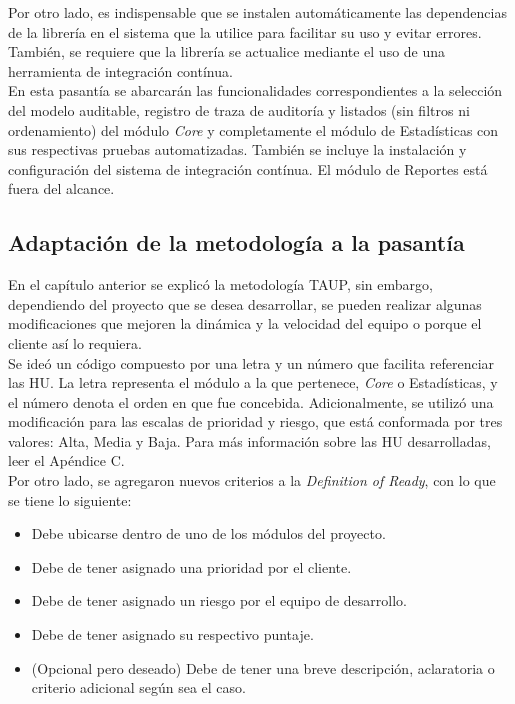 Por otro lado, es indispensable que se instalen automáticamente las dependencias de la librería en el sistema que la utilice para facilitar su uso y evitar errores. También, se requiere que la librería se actualice mediante el uso de una herramienta de integración contínua. \\

En esta pasantía se abarcarán las funcionalidades correspondientes a la selección del modelo auditable, registro de traza de auditoría y listados (sin filtros ni ordenamiento) del módulo \textit{Core} y completamente el módulo de Estadísticas con sus respectivas pruebas automatizadas. También se incluye la instalación y configuración del sistema de integración contínua. El módulo de Reportes está fuera del alcance.

\subsection{Adaptación de la metodología a la pasantía}

En el capítulo anterior se explicó la metodología TAUP, sin embargo, dependiendo del proyecto que se desea desarrollar, se pueden realizar algunas modificaciones que mejoren la dinámica y la velocidad del equipo o porque el cliente así lo requiera.\\

Se ideó un código compuesto por una letra y un número que facilita referenciar las HU. La letra representa el módulo a la que pertenece, \textit{Core} o Estadísticas, y el número denota el orden en que fue concebida. Adicionalmente, se utilizó una modificación  para las escalas de prioridad y riesgo, que está conformada por tres valores: Alta, Media y Baja. Para más información sobre las HU desarrolladas, leer el Apéndice C.\\

Por otro lado, se agregaron nuevos criterios a la \textit{Definition of Ready}, con lo que se tiene lo siguiente:

\begin{itemize}
    \item Debe ubicarse dentro de uno de los módulos del proyecto.
    \item Debe de tener asignado una prioridad por el cliente.
    \item Debe de tener asignado un riesgo por el equipo de desarrollo.
    \item Debe de tener asignado su respectivo puntaje.
    \item (Opcional pero deseado) Debe de tener una breve descripción, aclaratoria o criterio adicional según sea el caso.
\end{itemize}

